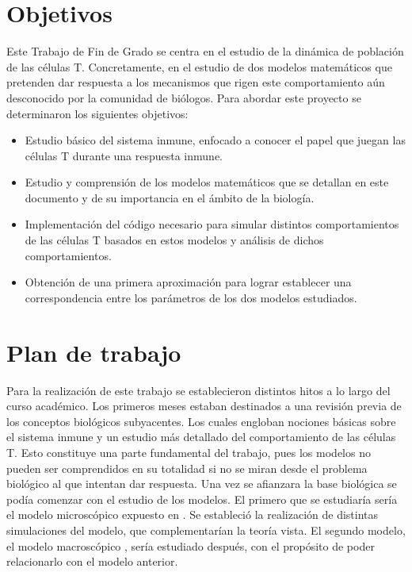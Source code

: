 \section{Objetivos}

Este Trabajo de Fin de Grado se centra en el estudio de la dinámica de población de las células T. Concretamente, en el estudio de dos modelos matemáticos que pretenden dar respuesta a los mecanismos que rigen este comportamiento aún desconocido por la comunidad de biólogos. Para abordar este proyecto se determinaron los siguientes objetivos:

 \begin{itemize}
 	
	\item Estudio básico del sistema inmune, enfocado a conocer el papel que juegan las células T durante una respuesta inmune.
	
	\item Estudio y comprensión de los modelos matemáticos que se detallan en este documento y de su importancia en el ámbito de la biología.
	
 	\item Implementación del código necesario para simular distintos comportamientos de las células T basados en estos modelos y análisis de dichos comportamientos. 
 	
 	\item Obtención de una primera aproximación para lograr establecer una correspondencia entre los parámetros de los dos modelos estudiados. 
 \end{itemize}


\section{Plan de trabajo}

Para la realización de este trabajo se establecieron distintos hitos a lo largo del curso académico. Los primeros meses estaban destinados a una revisión previa de los conceptos biológicos subyacentes. Los cuales engloban nociones básicas sobre el sistema inmune y un estudio más detallado del comportamiento de las células T. Esto constituye una parte fundamental del trabajo, pues los modelos no pueden ser comprendidos en su totalidad si no se miran desde el problema biológico al que intentan dar respuesta. Una vez se afianzara la base biológica se podía comenzar con el estudio de los modelos. El primero que se estudiaría sería el modelo microscópico expuesto en \cite{JTB}. Se estableció la realización de distintas simulaciones del modelo, que complementarían la teoría vista. El segundo modelo, el modelo macroscópico \citep{arias2015growth}, sería estudiado después, con el propósito de poder relacionarlo con el modelo anterior. 


